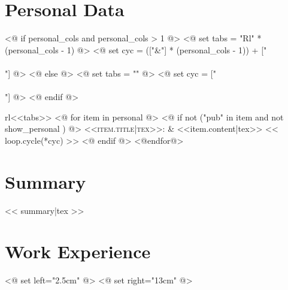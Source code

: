 \documentclass[letter,11pt]{article}
\begin{document}
\pagestyle{empty} %

\par{\bigskip\par}

\section*{Personal Data}

<@ if personal_cols and personal_cols > 1 @>
    <@ set tabs = "Rl" * (personal_cols - 1) @>
    <@ set cyc = (["&"] * (personal_cols - 1)) + ["\\\\"] @>
<@ else @>
    <@ set tabs = "" @>
    <@ set cyc = ["\\\\"] @>
<@ endif @>

\begin{tabularx}{\textwidth}{rl<<tabs>>}
<@ for item in  personal @>
    <@ if not ("pub" in item and not show_personal ) @>
    \textsc{<<item.title|tex>>:} & <<item.content|tex>> << loop.cycle(*cyc) >>
    <@ endif @>
<@endfor@>
\end{tabularx}

\section*{Summary}
<< summary|tex >>

\section*{Work Experience}

<@ set left="2.5cm" @>
<@ set right="13cm" @>

\setlength\LTleft{0cm}
\end{document}
